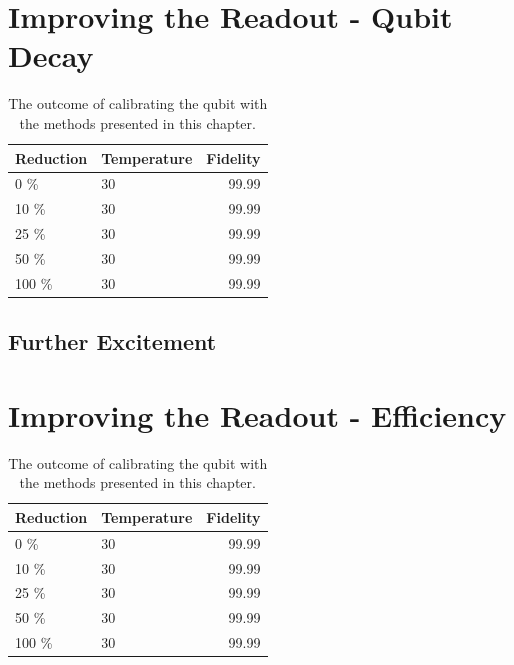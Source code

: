 \section{Improving the Readout - Qubit Decay}


\begin{table}[h]
\centering
\caption{The outcome of calibrating the qubit with the methods presented in this chapter.}
\begin{tabular}{ll|r}
\hline
\textbf{Reduction}        & Temperature                  & Fidelity\\ \hline
0   \%                      &  30                        &  99.99\\
10  \%                     &  30                         &  99.99\\
25  \%                     &  30                         &  99.99\\
50  \%                     &  30                         &  99.99\\
100 \%                     &  30                         &  99.99\\
\end{tabular}
\label{tab:readout_infidelity_contribution_estimation}
\end{table}



\subsection{Further Excitement}

\section{Improving the Readout - Efficiency}


\begin{table}[h]
\centering
\caption{The outcome of calibrating the qubit with the methods presented in this chapter.}
\begin{tabular}{ll|r}
\hline
\textbf{Reduction}        & Temperature                  & Fidelity\\ \hline
0   \%                      &  30                        &  99.99\\
10  \%                     &  30                         &  99.99\\
25  \%                     &  30                         &  99.99\\
50  \%                     &  30                         &  99.99\\
100 \%                     &  30                         &  99.99\\
\end{tabular}
\label{tab:readout_infidelity_contribution_estimation}
\end{table}



